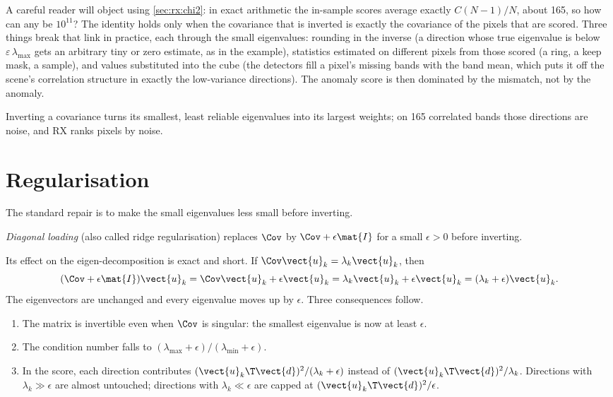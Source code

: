 A careful reader will object using \cref{sec:rx:chi2}: in exact arithmetic the in-sample scores
average exactly $C(N-1)/N$, about 165, so how can any be $10^{11}$? The identity holds only when the
covariance that is inverted is exactly the covariance of the pixels that are scored. Three things break
that link in practice, each through the small eigenvalues: rounding in the inverse (a direction whose
true eigenvalue is below $\varepsilon\,\lambda_{\max}$ gets an arbitrary tiny or zero estimate, as in the
 example), statistics estimated on different pixels from those scored (a ring, a keep mask,
a sample), and values substituted into the cube (the detectors fill a pixel's missing bands with the band
mean, which puts it off the scene's correlation structure in exactly the low-variance directions). The
anomaly score is then dominated by the mismatch, not by the anomaly.

\begin{keypoint}
Inverting a covariance turns its smallest, least reliable eigenvalues into its largest weights; on
165 correlated bands those directions are noise, and RX ranks pixels by noise.
\end{keypoint}

\section{Regularisation}\label{sec:rx:regularisation}

The standard repair is to make the small eigenvalues less small before inverting.

\begin{definition}
\emph{Diagonal loading} (also called ridge regularisation) replaces $\Cov$ by $\Cov + \epsilon\mat{I}$
for a small $\epsilon > 0$ before inverting.
\end{definition}

Its effect on the eigen-decomposition is exact and short. If $\Cov\vect{u}_k = \lambda_k\vect{u}_k$,
then
\[
(\Cov + \epsilon\mat{I})\vect{u}_k = \Cov\vect{u}_k + \epsilon\vect{u}_k = \lambda_k\vect{u}_k +
\epsilon\vect{u}_k = (\lambda_k + \epsilon)\vect{u}_k .
\]
The eigenvectors are unchanged and every eigenvalue moves up by $\epsilon$. Three consequences
follow.
\begin{enumerate}
  \item The matrix is invertible even when $\Cov$ is singular: the smallest eigenvalue is now at
    least $\epsilon$.
  \item The condition number falls to $(\lambda_{\max} + \epsilon)/(\lambda_{\min} + \epsilon)$.
  \item In the score, each direction contributes $(\vect{u}_k\T\vect{d})^2/(\lambda_k + \epsilon)$
    instead of $(\vect{u}_k\T\vect{d})^2/\lambda_k$. Directions with $\lambda_k \gg \epsilon$ are almost
    untouched; directions with $\lambda_k \ll \epsilon$ are capped at
    $(\vect{u}_k\T\vect{d})^2/\epsilon$.
\end{enumerate}

